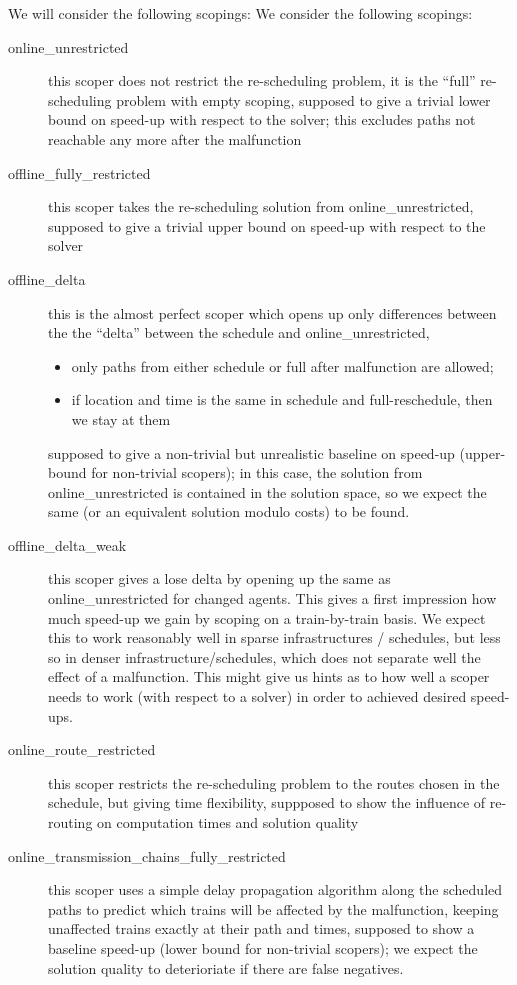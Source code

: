 \documentclass{article}
\begin{document}
We will consider the following scopings:
We consider the following scopings:
\begin{description}
\item[online\_unrestricted] this scoper does not restrict the re-scheduling problem, it is the ``full'' re-scheduling problem with empty scoping, supposed to give a trivial lower bound on speed-up with respect to the solver; this excludes paths not reachable any more after the malfunction
\item[offline\_fully\_restricted] this scoper takes the re-scheduling solution from online\_unrestricted, supposed to give a trivial upper bound on speed-up with respect to the solver
\item[offline\_delta]  this is the almost perfect scoper which opens up only differences between the  the ``delta'' between the schedule and online\_unrestricted,
\begin{itemize}
    \item only paths from either schedule or full after malfunction are allowed;
    \item if location and time is the same in schedule and full-reschedule, then we stay at them
\end{itemize}
supposed to give a non-trivial but unrealistic baseline on speed-up (upper-bound for non-trivial scopers); in this case, the solution from online\_unrestricted is contained in the solution space, so we expect the same (or an equivalent solution modulo costs) to be found.
\item[offline\_delta\_weak] this scoper gives a lose delta by opening up the same as online\_unrestricted for changed agents. This gives a first impression how much speed-up we gain by scoping on a train-by-train basis. We expect this to work reasonably well in sparse infrastructures / schedules, but less so in denser infrastructure/schedules, which does not separate well the effect of a malfunction. This might give us hints as to how well a scoper needs to work (with respect to a solver) in order to achieved desired speed-ups.
\item[online\_route\_restricted] this scoper restricts the re-scheduling problem to the routes chosen in the schedule, but giving time flexibility, suppposed to show the influence of re-routing on computation times and solution quality
\item[online\_transmission\_chains\_fully\_restricted] this scoper uses a simple delay propagation algorithm along the scheduled paths to predict which trains will be affected by the malfunction, keeping unaffected trains exactly at their path and times, supposed to show a baseline speed-up (lower bound for non-trivial scopers); we expect the solution quality to deterioriate if there are false negatives.

\end{description}
\end{document}
